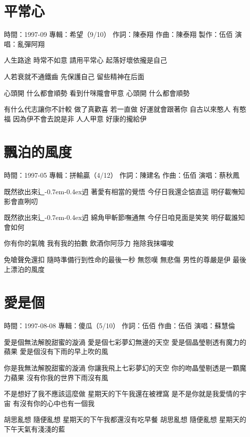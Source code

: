 \documentclass[UTF8,a4paper,oneside,twocolumn,12pt]{ctexbook}
\newcommand{\infopair}[2]{\textbullet #1：#2}
\newcommand{\zc}[1][伍佰]{\infopair{作詞}{#1}}
\newcommand{\zq}[1][伍佰]{\infopair{作曲}{#1}}
\newcommand{\zj}[1]{\infopair{專輯}{#1}}
\newcommand{\zz}[1]{\infopair{製作}{#1}}
\newcommand{\sj}[1]{\infopair{時間}{#1}}
\newcommand{\tshittho}{\hbox{辶\kern-0.7em\lower-0.4ex\hbox{\scalebox{0.7}{日}}}迌}
\newenvironment{info}{\begin{flushleft}\kaishu
	}
	{\end{flushleft}\normalsize\yahei\par}
\newenvironment{lyric}{
	}
{}
\begin{document}
\section{平常心}
\begin{info}
	\sj{1997-09}
	\zj{希望（9/10）}
	\zc[陳泰翔]
	\zq[陳泰翔]
	\zz{伍佰}
	\infopair{演唱}{亂彈阿翔}
\end{info}
\begin{lyric}
	人生路途 時常不如意 請用平常心
	起落好壞依攏是自己

	人若衰就不通鐵齒 先保護自己
	留些精神在后面

	心頭開 什么都會順勢
	看到什咪隴會甲意
	心頭開 什么都會順勢

	有什么代志讓你不計較 做了真歡喜
	若一直做 好運就會跟著你
	自古以來憨人 有憨福
	因為伊不會去說是非 人人甲意
	好康的攏給伊
\end{lyric}

\section{飄泊的風度}
\begin{info}
	\sj{1997-05}
	\zj{拼輸贏（4/12）}
	\zc[陳建名]
	\zq
	\infopair{演唱}{蔡秋鳳}
\end{info}
\begin{lyric}
	既然欲出來\tshittho{} 著愛有相當的覺悟
	今仔日我還企惦直這 明仔載嘸知影會直咧叨

	既然欲出來\tshittho{} 綿角甲斬節嘸通無
	今仔日咱見面是笑笑 明仔載誰知會如何

	你有你的氣魄 我有我的拍數
	飲酒你阿莎力 拖除我抹囉唆

	免嗆聲免還扣 隨時準備行到性命的最後一秒
	無怨嘆 無悲傷
	男性的尊嚴是伊 最後上漂泊的風度
\end{lyric}

\section{愛是個}
\begin{info}
	\sj{1997-08-08}
	\zj{傻瓜（5/10）}
	\zc
	\zq
	\infopair{演唱}{蘇慧倫}
\end{info}
\begin{lyric}
	愛是個無法解脫甜蜜的漩渦
	愛是個七彩夢幻無邊的天空
	愛是個晶瑩剔透有魔力的蘋果
	愛是個沒有下雨的早上吹的風

	你是我無法解脫甜蜜的漩渦
	你讓我飛上七彩夢幻的天空
	你的吻晶瑩剔透是一顆魔力蘋果
	沒有你我的世界下雨沒有風

	不是想好了我不應該這麼做
	星期天的下午我還在被裡窩
	是不是你就是我愛情的宇宙
	有沒有你的心中也有一個我

	胡思亂想 隨便亂想 星期天的下午我都還沒有吃早餐
	胡思亂想 隨便亂想 星期天的下午天氣有淺淺的藍
\end{lyric}
\end{document}
